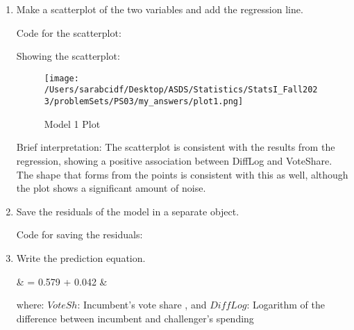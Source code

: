 \documentclass[12pt,letterpaper]{article}
\begin{document}
\begin{enumerate}
		\item Make a scatterplot of the two variables and add the regression line. 	\vspace{0.25cm}
		
		Code for the scatterplot: 
		
		
		Showing the scatterplot: 
		\begin{figure}[H]
			\centering
			\texttt{[image: /Users/sarabcidf/Desktop/ASDS/Statistics/StatsI\_Fall2023/problemSets/PS03/my\_answers/plot1.png]}
			\caption{Model 1 Plot}
		\end{figure}
		
		Brief interpretation: 
		The scatterplot is consistent with the results from the regression, showing a positive association between DiffLog and VoteShare. The shape that forms from the points is consistent with this as well, although the plot shows a significant amount of noise. 
		
		\item Save the residuals of the model in a separate object.	
		
		Code for saving the residuals: 
		
		
		\item Write the prediction equation.
		
		{\setlength{\abovedisplayskip}{2pt} 
			\setlength{\belowdisplayskip}{6pt} 
		
		\begin{flalign*}
			& = 0.579 + 0.042 \cdot {}  &
		\end{flalign*}
		
			where:  $VoteSh$: Incumbent's vote share , and $DiffLog$: Logarithm of the difference between incumbent and challenger's spending
	   }
		
 		\end{enumerate}
	
\newpage
\end{document}
